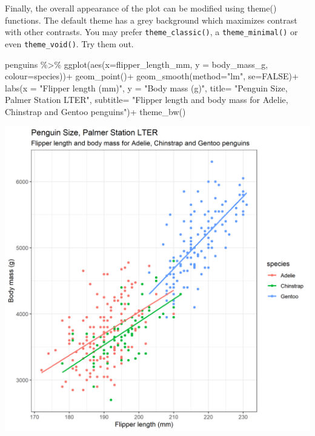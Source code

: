 \documentclass[
]{book}
\newenvironment{Shaded}{\begin{snugshade}}{\end{snugshade}}
\newcommand{\AttributeTok}[1]{\textcolor[rgb]{0.77,0.63,0.00}{#1}}
\newcommand{\ConstantTok}[1]{\textcolor[rgb]{0.00,0.00,0.00}{#1}}
\newcommand{\FunctionTok}[1]{\textcolor[rgb]{0.00,0.00,0.00}{#1}}
\newcommand{\NormalTok}[1]{#1}
\newcommand{\SpecialCharTok}[1]{\textcolor[rgb]{0.00,0.00,0.00}{#1}}
\newcommand{\StringTok}[1]{\textcolor[rgb]{0.31,0.60,0.02}{#1}}
\begin{document}
Finally, the overall appearance of the plot can be modified using theme() functions. The default theme has a grey background which maximizes contrast with other contrasts.
You may prefer \texttt{theme\_classic()}, a \texttt{theme\_minimal()} or even \texttt{theme\_void()}. Try them out.

\begin{Shaded}
\begin{Highlighting}[]
\NormalTok{penguins }\SpecialCharTok{\%\textgreater{}\%} 
  \FunctionTok{ggplot}\NormalTok{(}\FunctionTok{aes}\NormalTok{(}\AttributeTok{x=}\NormalTok{flipper\_length\_mm, }
             \AttributeTok{y =}\NormalTok{ body\_mass\_g,}
             \AttributeTok{colour=}\NormalTok{species))}\SpecialCharTok{+} 
  \FunctionTok{geom\_point}\NormalTok{()}\SpecialCharTok{+}
  \FunctionTok{geom\_smooth}\NormalTok{(}\AttributeTok{method=}\StringTok{"lm"}\NormalTok{,    }
              \AttributeTok{se=}\ConstantTok{FALSE}\NormalTok{)}\SpecialCharTok{+}
  \FunctionTok{labs}\NormalTok{(}\AttributeTok{x =} \StringTok{"Flipper length (mm)"}\NormalTok{,}
       \AttributeTok{y =} \StringTok{"Body mass (g)"}\NormalTok{,}
       \AttributeTok{title=} \StringTok{"Penguin Size, Palmer Station LTER"}\NormalTok{,}
       \AttributeTok{subtitle=} \StringTok{"Flipper length and body mass for Adelie, Chinstrap and Gentoo penguins"}\NormalTok{)}\SpecialCharTok{+}
  \FunctionTok{theme\_bw}\NormalTok{()}
\end{Highlighting}
\end{Shaded}

\includegraphics[width=0.8\linewidth]{images/theme_bw}
\end{document}
